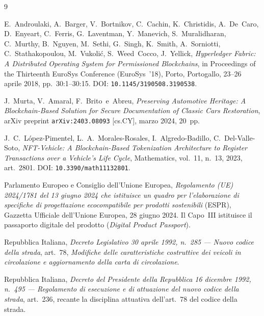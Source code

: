 \begin{thebibliography}{9}

E.~Androulaki, A.~Barger, V.~Bortnikov, C.~Cachin, K.~Christidis, A.~De~Caro,
D.~Enyeart, C.~Ferris, G.~Laventman, Y.~Manevich, S.~Muralidharan, C.~Murthy,
B.~Nguyen, M.~Sethi, G.~Singh, K.~Smith, A.~Sorniotti, C.~Stathakopoulou,
M.~Vukoli\'c, S.~Weed~Cocco, J.~Yellick,
\textit{Hyperledger Fabric: A Distributed Operating System for Permissioned
Blockchains}, in Proceedings of the Thirteenth EuroSys Conference (EuroSys~'18),
Porto, Portogallo, 23--26 aprile 2018, pp.~30:1--30:15.
\newblock DOI: \texttt{10.1145/3190508.3190538}.

J.~Murta, V.~Amaral, F.~Brito~e~Abreu,
\textit{Preserving Automotive Heritage: A Blockchain-Based Solution for Secure
Documentation of Classic Cars Restoration}, arXiv preprint
\texttt{arXiv:2403.08093} [cs.CY], marzo 2024, 20~pp.

J.~C.~L\'opez-Pimentel, L.~A.~Morales-Rosales, I.~Algredo-Badillo,
C.~Del-Valle-Soto,
\textit{NFT-Vehicle: A Blockchain-Based Tokenization Architecture to Register
Transactions over a Vehicle's Life Cycle}, Mathematics, vol.~11, n.~13, 2023,
art.~2801.
\newblock DOI: \texttt{10.3390/math11132801}.

Parlamento Europeo e Consiglio dell'Unione Europea,
\textit{Regolamento (UE) 2024/1781 del 13 giugno 2024 che istituisce un quadro
per l'elaborazione di specifiche di progettazione ecocompatibile per prodotti
sostenibili} (ESPR), Gazzetta Ufficiale dell'Unione Europea, 28 giugno 2024.
\newblock Il Capo~III istituisce il passaporto digitale del prodotto
(\textit{Digital Product Passport}).

Repubblica Italiana,
\textit{Decreto Legislativo 30 aprile 1992, n.~285 --- Nuovo codice della
strada}, art.~78, \textit{Modifiche delle caratteristiche costruttive dei
veicoli in circolazione e aggiornamento della carta di circolazione}.

Repubblica Italiana,
\textit{Decreto del Presidente della Repubblica 16 dicembre 1992, n.~495 ---
Regolamento di esecuzione e di attuazione del nuovo codice della strada},
art.~236, recante la disciplina attuativa dell'art.~78 del codice della strada.

\end{thebibliography}
